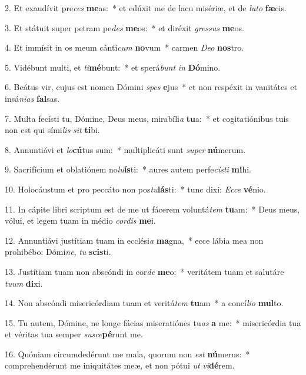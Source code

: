2. Et exaudívit pre\textit{ces} \textbf{me}as:~*  et edúxit me de lacu misériæ, et de \textit{lu}\textit{to} \textbf{fæ}cis.\

3. Et státuit super petram pe\textit{des} \textbf{me}os:~*  et diréxit \textit{gres}\textit{sus} \textbf{me}os.\

4. Et immísit in os meum cánti\textit{cum} \textbf{no}vum~*  carmen \textit{De}\textit{o} \textbf{nos}tro.\

5. Vidébunt multi, et \textit{ti}\textbf{mé}bunt:~*  et sperá\textit{bunt} \textit{in} \textbf{Dó}mino.\

6. Beátus vir, cujus est nomen Dómini \textit{spes} \textbf{e}jus~*  et non respéxit in vanitátes et insá\textit{ni}\textit{as} \textbf{fal}sas.\

7. Multa fecísti tu, Dómine, Deus meus, mirabíli\textit{a} \textbf{tu}a:~*  et cogitatiónibus tuis non est qui sími\textit{lis} \textit{sit} \textbf{ti}bi.\

8. Annuntiávi et \textit{lo}\textbf{cú}tus sum:~*  multiplicáti sunt \textit{su}\textit{per} \textbf{nú}merum.\

9. Sacrifícium et oblatiónem no\textit{lu}\textbf{ís}ti:~*  aures autem perfe\textit{cís}\textit{ti} \textbf{mi}hi.\

10. Holocáustum et pro peccáto non pos\textit{tu}\textbf{lás}ti:~*  tunc dixi: \textit{Ec}\textit{ce} \textbf{vé}nio.\

11. In cápite libri scriptum est de me ut fácerem voluntá\textit{tem} \textbf{tu}am:~*  Deus meus, vólui, et legem tuam in médio \textit{cor}\textit{dis} \textbf{me}i.\

12. Annuntiávi justítiam tuam in ecclési\textit{a} \textbf{ma}gna,~*  ecce lábia mea non prohibébo: Dómi\textit{ne}, \textit{tu} \textbf{scis}ti.\

13. Justítiam tuam non abscóndi in cor\textit{de} \textbf{me}o:~*  veritátem tuam et salutáre \textit{tu}\textit{um} \textbf{di}xi.\

14. Non abscóndi misericórdiam tuam et veritá\textit{tem} \textbf{tu}am~*  a concí\textit{li}\textit{o} \textbf{mul}to.\

15. Tu autem, Dómine, ne longe fácias miseratiónes tu\textit{as} \textbf{a} me:~*  misericórdia tua et véritas tua semper \textit{su}\textit{sce}\textbf{pé}runt me.\

16. Quóniam circumdedérunt me mala, quorum non \textit{est} \textbf{nú}merus:~*  comprehendérunt me iniquitátes meæ, et non pótui \textit{ut} \textit{vi}\textbf{dé}rem.\


